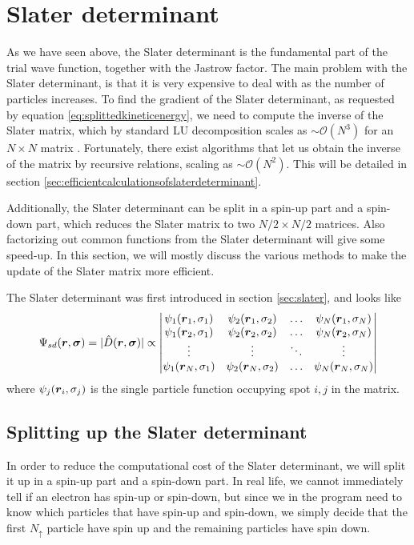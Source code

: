\section{Slater determinant}
As we have seen above, the Slater determinant is the fundamental part of the trial wave function, together with the Jastrow factor. The main problem with the Slater determinant, is that it is very expensive to deal with as the number of particles increases. To find the gradient of the Slater determinant, as requested by equation \eqref{eq:splittedkineticenergy}, we need to compute the inverse of the Slater matrix, which by standard LU decomposition scales as $\sim\mathcal{O}(N^3)$ for an $N\times N$ matrix \cite{trahan_computational_2006}. Fortunately, there exist algorithms that let us obtain the inverse of the matrix by recursive relations, scaling as $\sim\mathcal{O}(N^2)$. This will be detailed in section \ref{sec:efficientcalculationsofslaterdeterminant}.

Additionally, the Slater determinant can be split in a spin-up part and a spin-down part, which reduces the Slater matrix to two $N/2\times N/2$ matrices. Also factorizing out common functions from the Slater determinant will give some speed-up. In this section, we will mostly discuss the various methods to make the update of the Slater matrix more efficient. 

The Slater determinant was first introduced in section \ref{sec:slater}, and looks like
\begin{equation}
\Psi_{sd}(\boldsymbol{{r}},\boldsymbol{{\sigma}})=|\hat{D}(\boldsymbol{{r}},\boldsymbol{{\sigma}})|\propto
\begin{vmatrix}
\psi_1(\boldsymbol{r}_1,\sigma_1) & \psi_2(\boldsymbol{r}_1,\sigma_2) & \hdots & \psi_N(\boldsymbol{r}_1,\sigma_N)\\
\psi_1(\boldsymbol{r}_2,\sigma_1) & \psi_2(\boldsymbol{r}_2,\sigma_2) & \hdots & \psi_N(\boldsymbol{r}_2,\sigma_N)\\
\vdots & \vdots & \ddots & \vdots \\
\psi_1(\boldsymbol{r}_N,\sigma_1) & \psi_2(\boldsymbol{r}_N,\sigma_2) & \hdots & \psi_N(\boldsymbol{r}_N,\sigma_N)
\end{vmatrix}
\label{eq:generalslater}
\end{equation}
where $\psi_j(\boldsymbol{{r}}_i,\sigma_j)$ is the single particle function occupying spot $i,j$ in the matrix.

\subsection{Splitting up the Slater determinant} \label{sec:splittingofslater}
In order to reduce the computational cost of the Slater determinant, we will split it up in a spin-up part and a spin-down part. In real life, we cannot immediately tell if an electron has spin-up or spin-down, but since we in the program need to know which particles that have spin-up and spin-down, we simply decide that the first $N_{\uparrow}$ particle have spin up and the remaining particles have spin down. 

